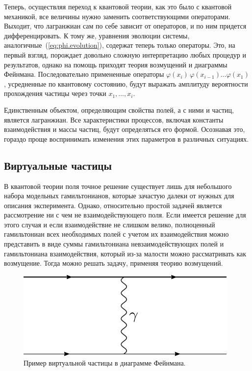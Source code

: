 \documentclass[a4paper, 12pt]{article}
\def\phi{\varphi}
\begin{document}
Теперь, осуществляя переход к квантовой теории, как это было с квантовой механикой, все величины нужно заменить соответствующими операторами. 
Выходит, что лагранжиан сам по себе зависит от операторов, и по ним придется дифференцировать. 
К тому же, уравнения эволюции системы, аналогичные~(\ref{eq:phi.evolution}), содержат теперь только операторы. 
Это, на первый взгляд, порождает довольно сложную интерпретацию любых процедур и результатов, однако на помощь приходят теория возмущений и диаграммы Фейнмана. 
Последовательно примененные операторы $\phi(x_i)\,\phi(x_{i-1})\ldots\phi(x_1)$, усредненные по квантовому состоянию, будут выражать амплитуду вероятности прохождения частицы через точки $x_1, \ldots, x_i$.

Единственным объектом, определяющим свойства полей, а с ними и частиц, является лагранжиан. 
Все характеристики процессов, включая константы взаимодействия и массы частиц, будут определяться его формой. 
Осознавая это, гораздо проще воспринимать изменения этих параметров в различных ситуациях. 

\subsection{Виртуальные частицы}

В квантовой теории поля точное решение существует лишь для небольшого набора модельных гамильтонианов, которые зачастую далеки от нужных для описания эксперимента. 
Однако, относительно простой задачей является рассмотрение ни с чем не взаимодействующего поля. 
Если имеется решение для этого случая и если взаимодействие не слишком велико, полноценный гамильтониан всех необходимых полей с учетом их взаимодействия можно представить в виде суммы гамильтониана невзаимодействующих полей и гамильтониана взаимодействия, который из-за малости можно рассматривать как возмущение. 
Тогда можно решать задачу, применяя теорию возмущений. 

\begin{figure}
\includegraphics[width=.45\linewidth]{figs/VirGamma}
\caption{Пример виртуальной частицы в диаграмме Фейнмана.}
\label{fig:VirGamma}
\end{figure}
\end{document}
